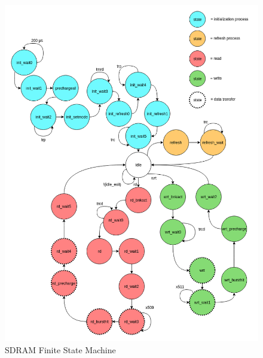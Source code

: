 \documentclass{article}
\begin{document}
\begin{figure}[!htb]
\caption{SDRAM Finite State Machine}
\label{fig:sdramfsm}
\centering
\includegraphics[scale=0.23]{sdramfsm2.png}
\end{figure}

\newpage
\end{document}
